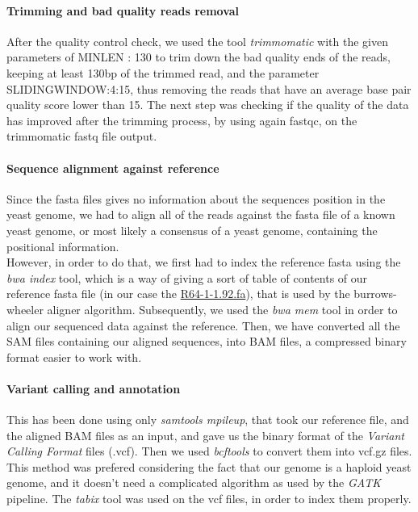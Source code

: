 \documentclass[10pt,a4paper]{article}
\begin{document}
\paragraph{Trimming and bad quality reads removal } After the quality control check, we used the tool \textit{trimmomatic}\cite{bolger_trimmomatic:_2014} with the given parameters of MINLEN : 130 to trim down the bad quality ends of the reads, keeping at least 130bp of the trimmed read, and the parameter SLIDINGWINDOW:4:15, thus removing the reads that have an average base pair quality score lower than 15. The next step was checking if the quality of the data has improved after the trimming process, by using again fastqc, on the trimmomatic fastq file output.

\paragraph{Sequence alignment against reference} Since the fasta files gives no information about the sequences position in the yeast genome, we had to align all of the reads against the fasta file of a known yeast genome, or most likely a consensus of a yeast genome, containing the positional information.\\
 
\noindent However, in order to do that, we first had to index the reference fasta using the \textit{bwa index} tool\cite{li_fast_2010}, which is a way of giving a sort of table of contents of our reference fasta file (in our case the \href{https://www.ensembl.org/Saccharomyces_cerevisiae/Info/Index}{R64-1-1.92.fa}), that is used by the burrows-wheeler aligner algorithm. Subsequently, we used the \textit{bwa mem} tool in order to align our sequenced data against the reference. Then, we have converted all the SAM\cite{li_sequence_2009} files containing our aligned sequences, into BAM files, a compressed binary format easier to work with.
 
\paragraph{Variant calling and annotation}
This has been done using only \textit{samtools mpileup}, that took our reference file, and the aligned BAM files as an input, and gave us the binary format of the \textit{Variant Calling Format} files (.vcf). Then we used \textit{bcftools} to convert them into vcf.gz files. This method was prefered considering the fact that our genome is a haploid yeast genome, and it doesn’t need a complicated algorithm as used by the \textit{GATK} pipeline. The \textit{tabix}\cite{li_tabix:_2011} tool was used on the vcf files, in order to index them properly.\\
\end{document}
